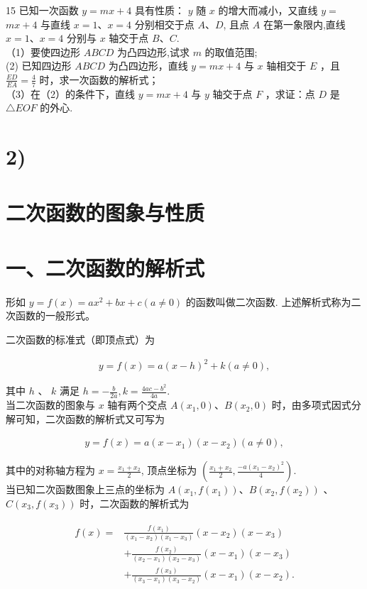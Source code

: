 \documentclass[10pt]{article}
\begin{document}
15 已知一次函数 $y=m x+4$ 具有性质： $y$ 随 $x$ 的增大而减小，又直线 $y=$ $m x+4$ 与直线 $x=1 、 x=4$ 分别相交于点 $A 、 D$, 且点 $A$ 在第一象限内,直线 $x=1 、 x=4$ 分别与 $x$ 轴交于点 $B 、 C$.\\
（1）要使四边形 $A B C D$ 为凸四边形,试求 $m$ 的取值范围;\\
(2) 已知四边形 $A B C D$ 为凸四边形，直线 $y=m x+4$ 与 $x$ 轴相交于 $E$ ，且 $\frac{E D}{E A}=\frac{4}{7}$ 时，求一次函数的解析式；\\
（3）在（2）的条件下，直线 $y=m x+4$ 与 $y$ 轴交于点 $F$ ，求证：点 $D$ 是 $\triangle E O F$ 的外心.

\section*{2)}
\section*{二次函数的图象与性质}
\section*{一、二次函数的解析式}
形如 $y=f(x)=a x^{2}+b x+c(a \neq 0)$ 的函数叫做二次函数. 上述解析式称为二次函数的一般形式。

二次函数的标准式（即顶点式）为

\begin{align*}
y=f(x)=a(x-h)^{2}+k(a \neq 0),
\end{align*}

其中 $h$ 、 $k$ 满足 $h=-\frac{b}{2 a}, k=\frac{4 a c-b^{2}}{4 a}$.\\
当二次函数的图象与 $x$ 轴有两个交点 $A\left(x_{1}, 0\right) 、 B\left(x_{2}, 0\right)$ 时，由多项式因式分解可知，二次函数的解析式又可写为

\begin{align*}
y=f(x)=a\left(x-x_{1}\right)\left(x-x_{2}\right)(a \neq 0),
\end{align*}

其中的对称轴方程为 $x=\frac{x_{1}+x_{2}}{2}$, 顶点坐标为 $\left(\frac{x_{1}+x_{2}}{2}, \frac{-a\left(x_{1}-x_{2}\right)^{2}}{4}\right)$.\\
当已知二次函数图象上三点的坐标为 $A\left(x_{1}, f\left(x_{1}\right)\right) 、 B\left(x_{2}, f\left(x_{2}\right)\right)$ 、 $C\left(x_{3}, f\left(x_{3}\right)\right)$ 时，二次函数的解析式为

\begin{align*}
\begin{aligned}
f(x)= & \frac{f\left(x_{1}\right)}{\left(x_{1}-x_{2}\right)\left(x_{1}-x_{3}\right)}\left(x-x_{2}\right)\left(x-x_{3}\right) \\
& +\frac{f\left(x_{2}\right)}{\left(x_{2}-x_{1}\right)\left(x_{2}-x_{3}\right)}\left(x-x_{1}\right)\left(x-x_{3}\right) \\
& +\frac{f\left(x_{3}\right)}{\left(x_{3}-x_{1}\right)\left(x_{3}-x_{2}\right)}\left(x-x_{1}\right)\left(x-x_{2}\right) .
\end{aligned}
\end{align*}
\end{document}
